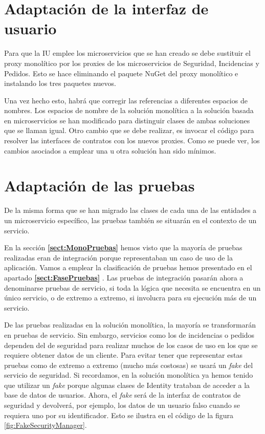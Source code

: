 \documentclass[11pt,spanish,listoffigures]{tfgetsinf}
\begin{document}
\newpage

\section{Adaptación de la interfaz de usuario}

Para que la IU emplee los microservicios que se han creado se debe sustituir el proxy monolítico por los proxies de los microservicios de Seguridad, Incidencias y Pedidos. Esto se hace eliminando el paquete NuGet del proxy monolítico e instalando los tres paquetes nuevos.

Una vez hecho esto, habrá que corregir las referencias a diferentes espacios de nombres. Los espacios de nombre de la solución monolítica a la solución basada en microservicios se han modificado para distinguir clases de ambas soluciones que se llaman igual. Otro cambio que se debe realizar, es invocar el código para resolver las interfaces de contratos con los nuevos proxies. Como se puede ver, los cambios asociados a emplear una u otra solución han sido mínimos.

\section{Adaptación de las pruebas}

De la misma forma que se han migrado las clases de cada una de las entidades a un microservicio específico, las pruebas también se situarán en el contexto de un servicio.

En la sección \textbf{\ref{sect:MonoPruebas} } hemos visto que la mayoría de pruebas realizadas eran de integración porque representaban un caso de uso de la aplicación. Vamos a emplear la clasificación de pruebas hemos presentado en el apartado \textbf{\ref{sect:FasePruebas} }. Las pruebas de integración pasarán ahora a denominarse pruebas de servicio, si toda la lógica que necesita se encuentra en un único servicio, o de extremo a extremo, si involucra para su ejecución más de un servicio.

De las pruebas realizadas en la solución monolítica, la mayoría se transformarán en pruebas de servicio. Sin embargo, servicios como los de incidencias o pedidos dependen del de seguridad para realizar muchos de los casos de uso en los que se requiere obtener datos de un cliente. Para evitar tener que representar estas pruebas como de extremo a extremo (mucho más costosas) se usará un \textit{fake} del servicio de seguridad. Si recordamos, en la solución monolítica ya hemos tenido que utilizar un \textit{fake} porque algunas clases de Identity trataban de acceder a la base de datos de usuarios. Ahora, el \textit{fake} será de la interfaz de contratos de seguridad y devolverá, por ejemplo, los datos de un usuario falso cuando se requiera uno por su identificador. Esto se ilustra en el código de la figura \ref{fig:FakeSecurityManager}.
\end{document}
